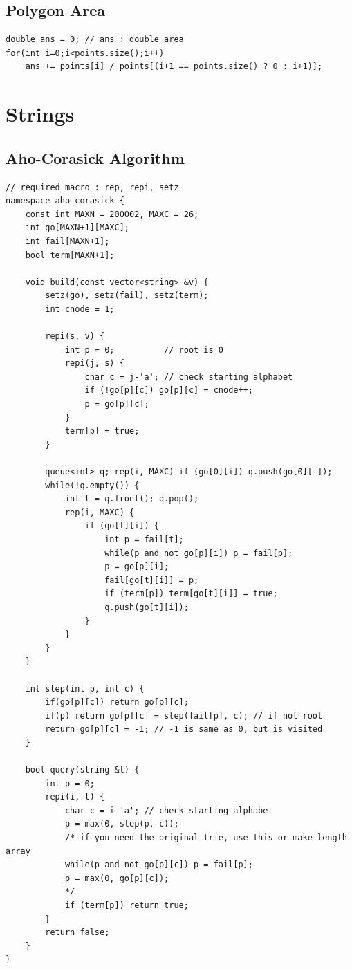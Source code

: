 \documentclass[landscape, 8pt, a4paper, oneside, twocolumn]{extarticle}
\begin{document}
\subsection{Polygon Area}
\begin{verbatim}
double ans = 0; // ans : double area
for(int i=0;i<points.size();i++)
    ans += points[i] / points[(i+1 == points.size() ? 0 : i+1)];
\end{verbatim}

\newpage
\section{Strings}

\subsection{Aho-Corasick Algorithm}
\begin{verbatim}
// required macro : rep, repi, setz
namespace aho_corasick {
    const int MAXN = 200002, MAXC = 26;
    int go[MAXN+1][MAXC];
    int fail[MAXN+1];
    bool term[MAXN+1];

    void build(const vector<string> &v) {
        setz(go), setz(fail), setz(term);
        int cnode = 1;

        repi(s, v) {
            int p = 0;          // root is 0
            repi(j, s) {
                char c = j-'a'; // check starting alphabet
                if (!go[p][c]) go[p][c] = cnode++;
                p = go[p][c];
            }
            term[p] = true;
        }

        queue<int> q; rep(i, MAXC) if (go[0][i]) q.push(go[0][i]);
        while(!q.empty()) {
            int t = q.front(); q.pop();
            rep(i, MAXC) {
                if (go[t][i]) {
                    int p = fail[t];
                    while(p and not go[p][i]) p = fail[p];
                    p = go[p][i];
                    fail[go[t][i]] = p;
                    if (term[p]) term[go[t][i]] = true;
                    q.push(go[t][i]);
                }
            }
        }
    }

    int step(int p, int c) {
        if(go[p][c]) return go[p][c];
        if(p) return go[p][c] = step(fail[p], c); // if not root
        return go[p][c] = -1; // -1 is same as 0, but is visited
    }

    bool query(string &t) {
        int p = 0;
        repi(i, t) {
            char c = i-'a'; // check starting alphabet
            p = max(0, step(p, c));
            /* if you need the original trie, use this or make length array
            while(p and not go[p][c]) p = fail[p];
            p = max(0, go[p][c]);
            */
            if (term[p]) return true;
        }
        return false;
    }
}
\end{verbatim}
\end{document}
